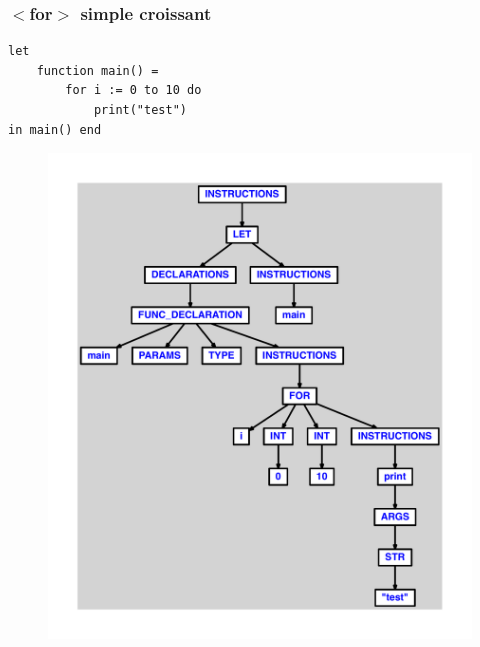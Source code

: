 \documentclass{article}
\begin{document}
\subsubsection{$ < $for$ > $ simple croissant}
\begin{lstlisting}
let
	function main() =
		for i := 0 to 10 do
			print("test")
in main() end
\end{lstlisting}
\newpage
\begin{figure}[H]
\centering
\includegraphics[max width=\textwidth]{ast/ast_205.pdf}
\end{figure}
\newpage
\end{document}
